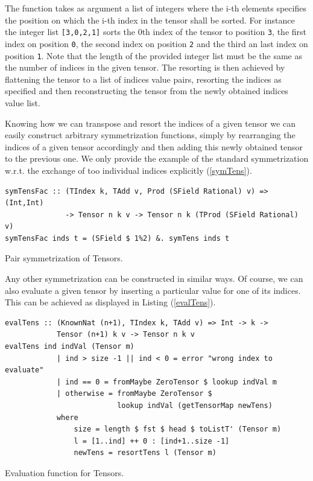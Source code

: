 \documentclass[a4paper,12pt, DIV=14, BCOR=5mm, twoside, headsepline, numbers=noenddot]{scrbook}
\begin{document}
The function takes as argument a list of integers where the i-th elements specifies the position on which the i-th index in the tensor shall be sorted. For instance the integer list \texttt{[3,0,2,1]} sorts the 0th index of the tensor to position \texttt{3}, the first index on position \texttt{0}, the second index on position \texttt{2} and the third an last index on position \texttt{1}. Note that the length of the provided integer list must be the same as the number of indices in the given tensor.  The resorting is then achieved by flattening the tensor to a list of indices value pairs, resorting the indices as specified and then reconstructing the tensor from the newly obtained indices value list. 

Knowing how we can transpose and resort the indices of a given tensor we can easily construct arbitrary symmetrization functions, simply by rearranging the indices of a given tensor accordingly and then adding this newly obtained tensor to the previous one. We only provide the example of the standard symmetrization w.r.t. the exchange of too individual indices explicitly (\ref{symTens}).

\begin{listing}[hbt!] 
\begin{verbatim}
symTensFac :: (TIndex k, TAdd v, Prod (SField Rational) v) => (Int,Int)
              -> Tensor n k v -> Tensor n k (TProd (SField Rational) v)
symTensFac inds t = (SField $ 1%2) &. symTens inds t
\end{verbatim} 
\caption{Pair symmetrization of Tensors.}\label{symTens}
\end{listing}

Any other symmetrization can be constructed in similar ways.
Of course, we can also evaluate a given tensor by inserting a particular value for one of its indices. This can be achieved as displayed in Listing (\ref{evalTens}).

\begin{listing}[hbt!] 
\begin{verbatim}
evalTens :: (KnownNat (n+1), TIndex k, TAdd v) => Int -> k ->
            Tensor (n+1) k v -> Tensor n k v
evalTens ind indVal (Tensor m)
            | ind > size -1 || ind < 0 = error "wrong index to evaluate"
            | ind == 0 = fromMaybe ZeroTensor $ lookup indVal m
            | otherwise = fromMaybe ZeroTensor $
                          lookup indVal (getTensorMap newTens)
            where
                size = length $ fst $ head $ toListT' (Tensor m)
                l = [1..ind] ++ 0 : [ind+1..size -1]
                newTens = resortTens l (Tensor m)
\end{verbatim}
\caption{Evaluation function for Tensors.}\label{evalTens}
\end{listing}
\end{document}
